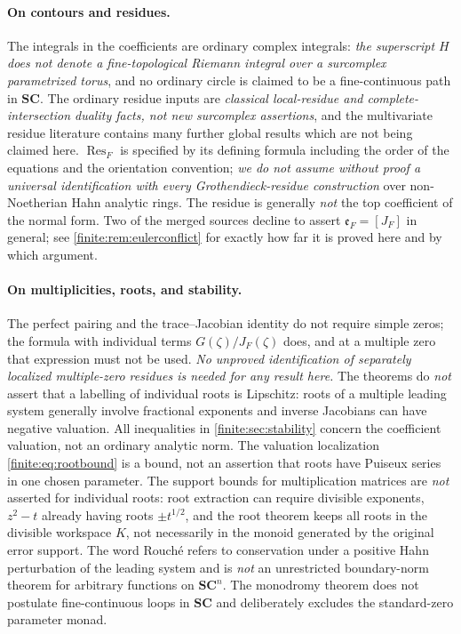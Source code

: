 \documentclass[11pt,letterpaper]{article}
\theoremstyle{definition}
\theoremstyle{remark}
\newcommand{\SC}{\mathbf{SC}}
\newcommand{\Eul}{\mathfrak e}
\DeclareMathOperator{\Res}{Res}
\numberwithin{equation}{section}
\begin{document}
\paragraph{On contours and residues.}
The integrals in the coefficients are ordinary complex integrals: \emph{the superscript $H$ does not denote a fine-topological Riemann integral over a surcomplex parametrized torus}, and no ordinary circle is claimed to be a fine-continuous path in $\SC$. The ordinary residue inputs are \emph{classical local-residue and complete-intersection duality facts, not new surcomplex assertions}, and the multivariate residue literature contains many further global results which are not being claimed here. $\Res_F$ is specified by its defining formula including the order of the equations and the orientation convention; \emph{we do not assume without proof a universal identification with every Grothendieck-residue construction} over non-Noetherian Hahn analytic rings. The residue is generally \emph{not} the top coefficient of the normal form. Two of the merged sources decline to assert $\Eul_F=[J_F]$ in general; see \cref{finite:rem:eulerconflict} for exactly how far it is proved here and by which argument.

\paragraph{On multiplicities, roots, and stability.}
The perfect pairing and the trace--Jacobian identity do not require simple zeros; the formula with individual terms $G(\zeta)/J_F(\zeta)$ does, and at a multiple zero that expression must not be used. \emph{No unproved identification of separately localized multiple-zero residues is needed for any result here.} The theorems do \emph{not} assert that a labelling of individual roots is Lipschitz: roots of a multiple leading system generally involve fractional exponents and inverse Jacobians can have negative valuation. All inequalities in \cref{finite:sec:stability} concern the coefficient valuation, not an ordinary analytic norm. The valuation localization \eqref{finite:eq:rootbound} is a bound, not an assertion that roots have Puiseux series in one chosen parameter. The support bounds for multiplication matrices are \emph{not} asserted for individual roots: root extraction can require divisible exponents, $z^2-t$ already having roots $\pm t^{1/2}$, and the root theorem keeps all roots in the divisible workspace $K$, not necessarily in the monoid generated by the original error support. The word Rouch\'e refers to conservation under a positive Hahn perturbation of the leading system and is \emph{not} an unrestricted boundary-norm theorem for arbitrary functions on $\SC^n$. The monodromy theorem does not postulate fine-continuous loops in $\SC$ and deliberately excludes the standard-zero parameter monad.
\end{document}
